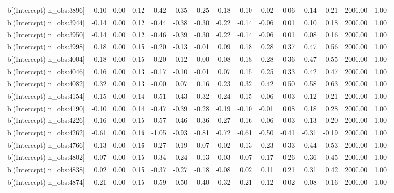 \begin{table}[ht]
\begin{tabular}{rrrrrrrrrrrrrrr}
  b[(Intercept) n\_obs:3896] & -0.10 & 0.00 & 0.12 & -0.42 & -0.35 & -0.25 & -0.18 & -0.10 & -0.02 & 0.06 & 0.14 & 0.21 & 2000.00 & 1.00 \\ 
  b[(Intercept) n\_obs:3944] & -0.14 & 0.00 & 0.12 & -0.44 & -0.38 & -0.30 & -0.22 & -0.14 & -0.06 & 0.01 & 0.10 & 0.18 & 2000.00 & 1.00 \\ 
  b[(Intercept) n\_obs:3950] & -0.14 & 0.00 & 0.12 & -0.46 & -0.39 & -0.30 & -0.22 & -0.14 & -0.06 & 0.01 & 0.08 & 0.16 & 2000.00 & 1.00 \\ 
  b[(Intercept) n\_obs:3998] & 0.18 & 0.00 & 0.15 & -0.20 & -0.13 & -0.01 & 0.09 & 0.18 & 0.28 & 0.37 & 0.47 & 0.56 & 2000.00 & 1.00 \\ 
  b[(Intercept) n\_obs:4004] & 0.18 & 0.00 & 0.15 & -0.20 & -0.12 & -0.00 & 0.08 & 0.18 & 0.28 & 0.36 & 0.47 & 0.55 & 2000.00 & 1.00 \\ 
  b[(Intercept) n\_obs:4046] & 0.16 & 0.00 & 0.13 & -0.17 & -0.10 & -0.01 & 0.07 & 0.15 & 0.25 & 0.33 & 0.42 & 0.47 & 2000.00 & 1.00 \\ 
  b[(Intercept) n\_obs:4082] & 0.32 & 0.00 & 0.13 & -0.00 & 0.07 & 0.16 & 0.23 & 0.32 & 0.42 & 0.50 & 0.58 & 0.63 & 2000.00 & 1.00 \\ 
  b[(Intercept) n\_obs:4154] & -0.15 & 0.00 & 0.14 & -0.51 & -0.43 & -0.32 & -0.24 & -0.15 & -0.06 & 0.03 & 0.12 & 0.21 & 2000.00 & 1.00 \\ 
  b[(Intercept) n\_obs:4190] & -0.10 & 0.00 & 0.14 & -0.47 & -0.39 & -0.28 & -0.19 & -0.10 & -0.01 & 0.08 & 0.18 & 0.28 & 2000.00 & 1.00 \\ 
  b[(Intercept) n\_obs:4226] & -0.16 & 0.00 & 0.15 & -0.57 & -0.46 & -0.36 & -0.27 & -0.16 & -0.06 & 0.03 & 0.13 & 0.20 & 2000.00 & 1.00 \\ 
  b[(Intercept) n\_obs:4262] & -0.61 & 0.00 & 0.16 & -1.05 & -0.93 & -0.81 & -0.72 & -0.61 & -0.50 & -0.41 & -0.31 & -0.19 & 2000.00 & 1.00 \\ 
  b[(Intercept) n\_obs:4766] & 0.13 & 0.00 & 0.16 & -0.27 & -0.19 & -0.07 & 0.02 & 0.13 & 0.23 & 0.33 & 0.44 & 0.53 & 2000.00 & 1.00 \\ 
  b[(Intercept) n\_obs:4802] & 0.07 & 0.00 & 0.15 & -0.34 & -0.24 & -0.13 & -0.03 & 0.07 & 0.17 & 0.26 & 0.36 & 0.45 & 2000.00 & 1.00 \\ 
  b[(Intercept) n\_obs:4838] & 0.02 & 0.00 & 0.15 & -0.37 & -0.27 & -0.18 & -0.08 & 0.02 & 0.11 & 0.21 & 0.31 & 0.42 & 2000.00 & 1.00 \\ 
  b[(Intercept) n\_obs:4874] & -0.21 & 0.00 & 0.15 & -0.59 & -0.50 & -0.40 & -0.32 & -0.21 & -0.12 & -0.02 & 0.08 & 0.16 & 2000.00 & 1.00 \\ 

\end{tabular}
\end{table}
